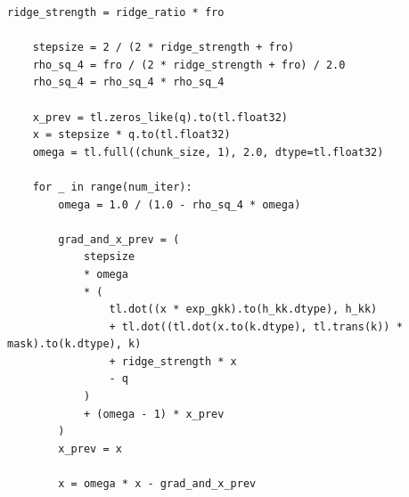 \begin{lstlisting}[caption={Excerpt from \texttt{repos/\allowbreak awslabs\_\_hybrid-model-factory/\allowbreak training/\allowbreak src/\allowbreak hmf/\allowbreak model/\allowbreak hybrid\_zoo/\allowbreak layers/\allowbreak gated\_kalmanet/\allowbreak ops/\allowbreak chebyshev/\allowbreak chebyshev\_iteration.py} (end of \texttt{chebyshev\_iteration\_fro\_gating\_forward\_kernel}).},label={lst:c08-gka-cheb}]
    ridge_strength = ridge_ratio * fro

    stepsize = 2 / (2 * ridge_strength + fro)
    rho_sq_4 = fro / (2 * ridge_strength + fro) / 2.0
    rho_sq_4 = rho_sq_4 * rho_sq_4

    x_prev = tl.zeros_like(q).to(tl.float32)
    x = stepsize * q.to(tl.float32)
    omega = tl.full((chunk_size, 1), 2.0, dtype=tl.float32)

    for _ in range(num_iter):
        omega = 1.0 / (1.0 - rho_sq_4 * omega)

        grad_and_x_prev = (
            stepsize
            * omega
            * (
                tl.dot((x * exp_gkk).to(h_kk.dtype), h_kk)
                + tl.dot((tl.dot(x.to(k.dtype), tl.trans(k)) * mask).to(k.dtype), k)
                + ridge_strength * x
                - q
            )
            + (omega - 1) * x_prev
        )
        x_prev = x

        x = omega * x - grad_and_x_prev
\end{lstlisting}

